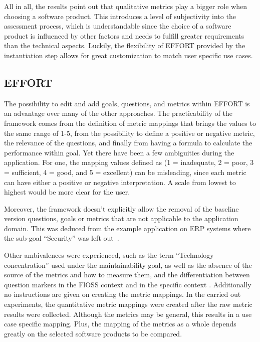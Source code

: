 All in all, the results point out that qualitative metrics play a bigger
role when choosing a software product. This introduces a level of
subjectivity into the assessment process, which is understandable since
the choice of a software product is influenced by other factors and
needs to fulfill greater requirements than the technical aspects.
Luckily, the flexibility of EFFORT provided by the instantiation step
allows for great customization to match user specific use cases.

\hypertarget{effort-1}{%
    \subsection{EFFORT}\label{effort-1}}

The possibility to edit and add goals, questions, and
metrics within EFFORT is an advantage over many of the other
approaches. The practicability of the framework comes from the
definition of metric mappings that brings the values to the same range
of 1-5, from the possibility to define a positive or negative metric,
the relevance of the questions, and finally from having a formula to
calculate the performance within goal. Yet there have been a few
ambiguities during the application. For one, the mapping values defined
as (1 = inadequate, 2 = poor, 3 = sufficient, 4 = good, and 5 =
excellent) can be misleading, since each metric can have either a
positive or negative interpretation. A scale from lowest to highest
would be more clear for the user.

Moreover, the framework doesn't explicitly allow the removal of the
baseline version questions, goals or metrics that are not applicable to
the application domain. This was deduced from the example application on
ERP systems where the sub-goal ``Security'' was left out~\cite{effort}.

Other ambivalences were experienced, such as the term ``Technology
concentration'' used under the maintainability goal, as well as the
absence of the source of the metrics and how to measure them, and
the differentiation between question markers in
the FlOSS context and in the specific context \cite{effort}.
Additionally no instructions are given on creating the metric mappings.
In the carried out experiments, the quantitative metric mappings were
created after the raw metric results were collected. Although the
metrics may be general, this results in a use case specific mapping.
Plus, the mapping of the metrics as a whole depends greatly on the
selected software products to be compared.

